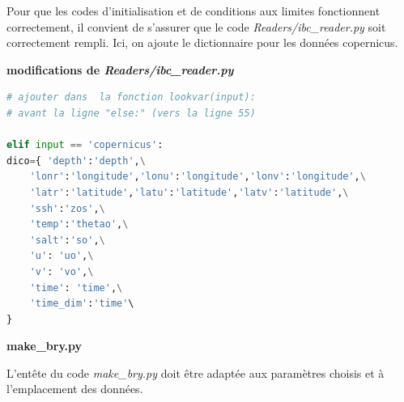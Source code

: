 \documentclass[10pt,a4paper,titlepage]{article}
\begin{document}
Pour que les codes d'initialisation et de conditions aux limites fonctionnent correctement, il convient de s'assurer que le code \textit{Readers/ibc\_reader.py} soit correctement rempli.  Ici, on ajoute le dictionnaire pour les données copernicus.

\begin{codeEnv}{\textbf{modifications de \textit{Readers/ibc\_reader.py}}}
\begin{lstlisting}[language=python]
# ajouter dans  la fonction lookvar(input):
# avant la ligne "else:" (vers la ligne 55)

elif input == 'copernicus':
dico={ 'depth':'depth',\
    'lonr':'longitude','lonu':'longitude','lonv':'longitude',\
    'latr':'latitude','latu':'latitude','latv':'latitude',\
    'ssh':'zos',\
    'temp':'thetao',\
    'salt':'so',\
    'u': 'uo',\
    'v': 'vo',\
    'time': 'time',\
    'time_dim':'time'\
}
\end{lstlisting}
\end{codeEnv}

\textbf{make\_bry.py}

L'entête du code \textit{make\_bry.py} doit être adaptée aux paramètres choisis et à l'emplacement des données.
\end{document}
